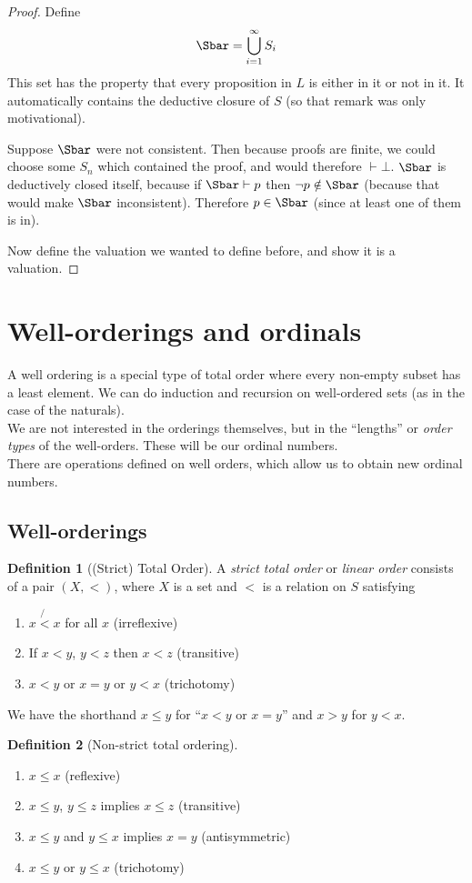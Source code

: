 \documentclass{article}
\theoremstyle{definition}
\newtheorem{definition}{Definition}
\numberwithin{definition}{section}
\newcommand{\proves}{\vdash}
\begin{document}
\begin{proof}
Define 
  $$\Sbar = \bigcup_{i=1}^{\infty} S_{i}$$
  This set has the property that every proposition in $L$ 
    is either in it or not in it. 
  It automatically contains the deductive closure of $S$ 
  (so that remark was only motivational). 
  
  Suppose $\Sbar$ were not consistent. 
  Then because proofs are finite, we could choose 
  some $S_{n}$ which contained the proof, and would therefore $\proves \bot$. 
  $\Sbar$ is deductively closed itself, because 
  if $\Sbar \proves p$ then $\neg p \notin \Sbar$ 
  (because that would make $\Sbar$ inconsistent). 
  Therefore $p \in \Sbar$ (since at least one of them is in). 
  
  Now define the valuation we wanted to define before, and show it is a valuation. 
\end{proof}

\section{Well-orderings and ordinals}
A well ordering is a special type of total order where every non-empty subset has a least element. We can do induction and recursion on well-ordered sets (as in the case of the naturals). \\
We are not interested in the orderings themselves, but in the ``lengths'' or \textit{order types} of the well-orders. These will be our ordinal numbers. \\
There are operations defined on well orders, which allow us to obtain new ordinal numbers. \\
\subsection{Well-orderings}
\begin{definition}[(Strict) Total Order]
A \textit{strict total order} or \textit{linear order} consists of a pair $(X,<)$, where $X$ is a set and $<$ is a relation on $S$ satisfying
\begin{enumerate}[i]
\item $ x \not{<} x$ for all $x$ (irreflexive)
\item If $x<y$, $y<z$ then $x<z$ (transitive)
\item $x<y$ or $x=y$ or $y<x$ (trichotomy)
\end{enumerate}
\end{definition}
We have the shorthand $x \le y$ for ``$x<y$ or $x=y$'' and $x>y$ for $y<x$. \\
\begin{definition}[Non-strict total ordering]
\begin{enumerate}[i]
\item $x \le x$ (reflexive) 
\item $x \le y$, $y \le z$ implies $x \le z$ (transitive) 
\item $x \le y$ and $y \le x$ implies $x=y$ (antisymmetric)
\item $x \le y$ or $y \le x$ (trichotomy)
\end{enumerate}
\end{definition}
\end{document}
